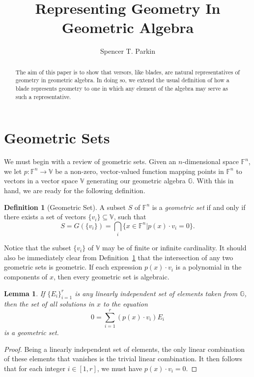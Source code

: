 \documentclass{birkjour}
\newtheorem{lem}[thm]{Lemma}
\theoremstyle{definition}
\newtheorem{defn}[thm]{Definition}
\theoremstyle{remark}
\numberwithin{equation}{section}
\newcommand{\F}{\mathbb{F}}
\newcommand{\G}{\mathbb{G}}
\newcommand{\V}{\mathbb{V}}
\begin{document}
\title{Representing Geometry In Geometric Algebra}

\author{Spencer T. Parkin}



\begin{abstract}
The aim of this paper is to show that versors, like blades, are natural representatives of geometry in geometric algebra.
In doing so, we extend the usual definition of how a blade represents geometry to one in which
any element of the algebra may serve as such a representative.
\end{abstract}


\maketitle

\section{Geometric Sets}

We must begin with a review of geometric sets.  Given an $n$-dimensional space $\F^n$, we let $p:\F^n\to\V$ be a non-zero, vector-valued
function mapping points in $\F^n$ to vectors in a vector space $\V$ generating our geometric algebra $\G$.  With this in hand,
we are ready for the following definition.
\begin{defn}[Geometric Set]\label{def_geo_set}
A subset $S$ of $\F^n$ is a \emph{geometric set} if and only if there exists a set of vectors $\{v_i\}\subseteq\V$, such that
\begin{equation}\label{equ_geo_set_def}
S = G(\{v_i\}) = \bigcap_i \{x\in\F^n|p(x)\cdot v_i=0\}.
\end{equation}
\end{defn}
Notice that the subset $\{v_i\}$ of $\V$ may be of finite or infinite cardinality.  It should also be immediately clear
from Definition~\ref{def_geo_set} that the intersection of any two geometric sets is geometric.
If each expression $p(x)\cdot v_i$ is a polynomial in the components of $x$, then every geometric set is algebraic.

\begin{lem}\label{lem_geo_set_lin_indep}
If $\{E_i\}_{i=1}^r$ is any linearly independent set of elements taken from $\G$, then the set of all
solutions in $x$ to the equation
\begin{equation}\label{equ_geo_set}
0 = \sum_{i=1}^r (p(x)\cdot v_i)E_i
\end{equation}
is a geometric set.
\end{lem}
\begin{proof}
Being a linearly independent set of elements, the only linear combination of these elements that vanishes is the trivial linear combination.
It then follows that for each integer $i\in[1,r]$, we must have $p(x)\cdot v_i=0$.
\end{proof}
\end{document}
